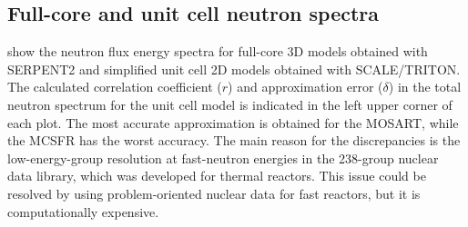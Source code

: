 \documentclass[letterpaper]{mandc2019}
\begin{document}
\subsection{Full-core and unit cell neutron spectra}
\label{sec:spectrum}
 show the neutron flux energy spectra for full-core 3D models obtained with SERPENT2 and simplified unit cell 2D models obtained with SCALE/TRITON. 
The calculated correlation coefficient ($r$) and approximation error ($\delta$) in the total neutron spectrum for the unit cell model is indicated in the left upper corner of each plot. 
The most accurate approximation is obtained for the \gls{MOSART}, while the \gls{MCSFR} has the worst accuracy. 
The main reason for the discrepancies is the low-energy-group resolution at fast-neutron energies in the 238-group nuclear data library, which was developed for thermal reactors. 
This issue could be resolved by using problem-oriented nuclear data for fast reactors, but it is computationally expensive.
\end{document}
